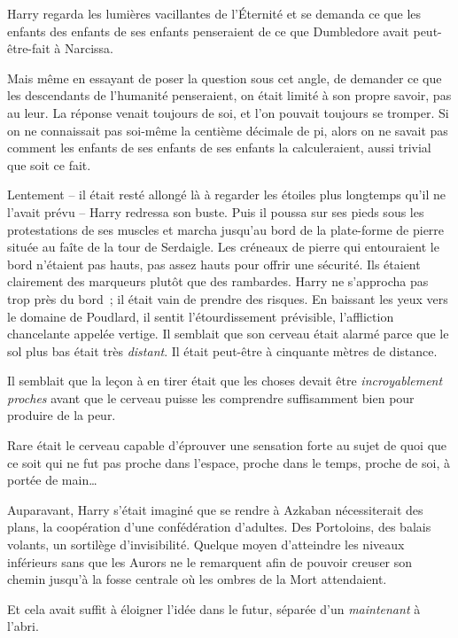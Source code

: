 Harry regarda les lumières vacillantes de l'Éternité et se demanda ce que les enfants des enfants de ses enfants penseraient de ce que Dumbledore avait peut-être-fait à Narcissa.

Mais même en essayant de poser la question sous cet angle, de demander ce que les descendants de l'humanité penseraient, on était limité à son propre savoir, pas au leur. La réponse venait toujours de soi, et l'on pouvait toujours se tromper. Si on ne connaissait pas soi-même la centième décimale de pi, alors on ne savait pas comment les enfants de ses enfants de ses enfants la calculeraient, aussi trivial que soit ce fait.

\later

Lentement -- il était resté allongé là à regarder les étoiles plus longtemps qu'il ne l'avait prévu -- Harry redressa son buste. Puis il poussa sur ses pieds sous les protestations de ses muscles et marcha jusqu'au bord de la plate-forme de pierre située au faîte de la tour de Serdaigle. Les créneaux de pierre qui entouraient le bord n'étaient pas hauts, pas assez hauts pour offrir une sécurité. Ils étaient clairement des marqueurs plutôt que des rambardes. Harry ne s'approcha pas trop près du bord~; il était vain de prendre des risques. En baissant les yeux vers le domaine de Poudlard, il sentit l'étourdissement prévisible, l'affliction chancelante appelée vertige. Il semblait que son cerveau était alarmé parce que le sol plus bas était très \emph{distant}. Il était peut-être à cinquante mètres de distance.

Il semblait que la leçon à en tirer était que les choses devait être \emph{incroyablement proches} avant que le cerveau puisse les comprendre suffisamment bien pour produire de la peur.

Rare était le cerveau capable d'éprouver une sensation forte au sujet de quoi que ce soit qui ne fut pas proche dans l'espace, proche dans le temps, proche de soi, à portée de main…

Auparavant, Harry s'était imaginé que se rendre à Azkaban nécessiterait des plans, la coopération d'une confédération d'adultes. Des Portoloins, des balais volants, un sortilège d'invisibilité. Quelque moyen d'atteindre les niveaux inférieurs sans que les Aurors ne le remarquent afin de pouvoir creuser son chemin jusqu'à la fosse centrale où les ombres de la Mort attendaient.

Et cela avait suffit à éloigner l'idée dans le futur, séparée d'un \emph{maintenant} à l'abri.

